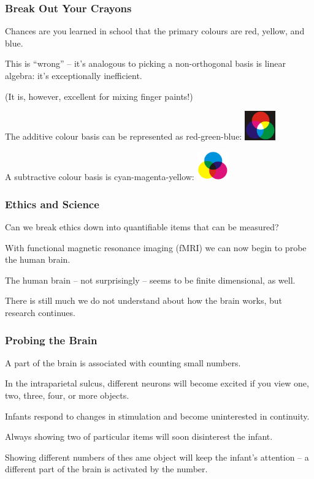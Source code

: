 \begin{frame}
\frametitle{Break Out Your Crayons}

Chances are you learned in school that the primary colours are red, yellow, and blue.

This is ``wrong'' -- it's analogous to picking a non-orthogonal basis is linear algebra:  it's exceptionally inefficient.

(It is, however, excellent for mixing finger paints!)

The additive colour basis can be represented as red-green-blue:
\includegraphics[width=0.1\textwidth]{images/rgb}

A subtractive colour basis is cyan-magenta-yellow:
\includegraphics[width=0.1\textwidth]{images/cmy}

\end{frame}



\begin{frame}
\frametitle{Ethics and Science}

Can we break ethics down into quantifiable items that can be measured?

With functional magnetic resonance imaging (fMRI) we can now begin to probe the human brain.

The human brain -- not surprisingly -- seems to be finite dimensional, as well.

There is still much we do not understand about how the brain works, but research continues.

\end{frame}



\begin{frame}
\frametitle{Probing the Brain}

A part of the brain is associated with counting small numbers.

In the intraparietal sulcus, different neurons will become excited if you view one, two, three, four, or more objects.

Infants respond to changes in stimulation and become uninterested in continuity.

Always showing two of particular items will soon disinterest the infant.

Showing different numbers of thes ame object will keep the infant's attention -- a different part of the brain is activated by the number.


\end{frame}



